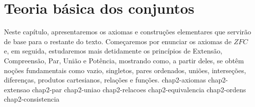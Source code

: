 \chapter{Teoria básica dos conjuntos}\label{chap:teoriaBasicaDosConjuntos}
Neste capítulo, apresentaremos os axiomas e construções elementares que servirão de base para o restante do texto.
Começaremos por enunciar os axiomas de $ZFC$ e, em seguida, estudaremos mais detidamente os princípios de Extensão, Compreensão, Par, União e Potência, mostrando como, a partir deles, se obtêm noções fundamentais como vazio, singletos, pares ordenados, uniões, interseções, diferenças, produtos cartesianos, relações e funções.
{chap2-axiomas}
{chap2-extensao}
{chap2-par}
{chap2-uniao}
{chap2-relacoes}
{chap2-equivalencia}
{chap2-ordens}
{chap2-consistencia}
